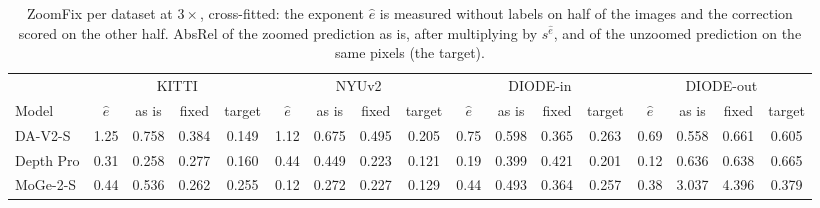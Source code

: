 \begin{table}[t]\centering\scriptsize
\caption{ZoomFix per dataset at $3\times$, cross-fitted: the exponent $\hat e$ is measured without labels on half of the images and the correction scored on the other half. AbsRel of the zoomed prediction as is, after multiplying by $s^{\hat e}$, and of the unzoomed prediction on the same pixels (the target).}\label{tab:zoomfix}
\setlength{\tabcolsep}{3pt}
\begin{tabular}{l cccc cccc cccc cccc}\toprule
& \multicolumn{4}{c}{KITTI} & \multicolumn{4}{c}{NYUv2} & \multicolumn{4}{c}{DIODE-in} & \multicolumn{4}{c}{DIODE-out} \\
\cmidrule(lr){2-5}\cmidrule(lr){6-9}\cmidrule(lr){10-13}\cmidrule(lr){14-17}
Model & $\hat e$ & as is & fixed & target & $\hat e$ & as is & fixed & target & $\hat e$ & as is & fixed & target & $\hat e$ & as is & fixed & target \\ \midrule
DA-V2-S & 1.25 & 0.758 & 0.384 & 0.149 & 1.12 & 0.675 & 0.495 & 0.205 & 0.75 & 0.598 & 0.365 & 0.263 & 0.69 & 0.558 & 0.661 & 0.605 \\
Depth Pro & 0.31 & 0.258 & 0.277 & 0.160 & 0.44 & 0.449 & 0.223 & 0.121 & 0.19 & 0.399 & 0.421 & 0.201 & 0.12 & 0.636 & 0.638 & 0.665 \\
MoGe-2-S & 0.44 & 0.536 & 0.262 & 0.255 & 0.12 & 0.272 & 0.227 & 0.129 & 0.44 & 0.493 & 0.364 & 0.257 & 0.38 & 3.037 & 4.396 & 0.379 \\
\bottomrule\end{tabular}\end{table}
